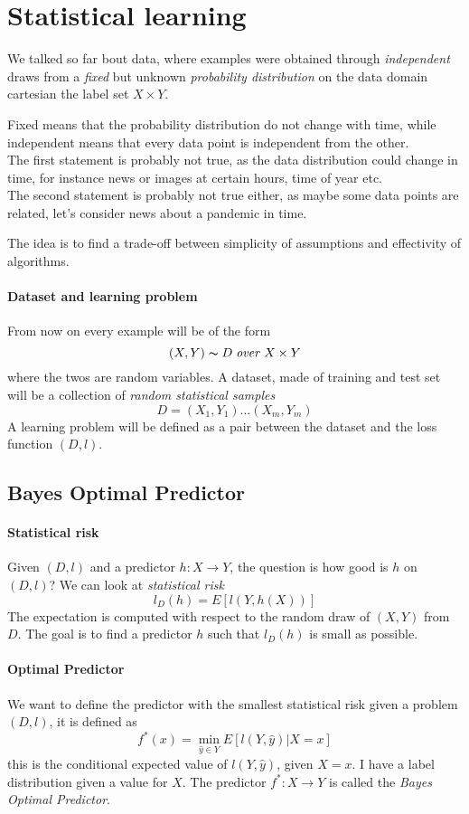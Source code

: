 \section{Statistical learning}

We talked so far bout data, where 
examples were obtained through \emph{independent} draws from a \emph{fixed} but unknown 
\emph{probability distribution} on the data domain cartesian the label set $X \times Y$.

Fixed means that the probability distribution do not change with time, while independent means 
that every data point is independent from the other. \\The first statement is probably not true, 
as the data distribution could change in time, for instance news or images at certain hours, 
time of year etc.\\
The second statement is probably not true either, as maybe some data points are related, 
let's consider news about a pandemic in time.

The idea is to find a trade-off between simplicity of assumptions and effectivity of algorithms.

\paragraph{Dataset and learning problem}
From now on every example will be of the form $$(X,Y) \thicksim D \mathit{\;over\;} X \times Y$$ 
where the twos are random variables.
A dataset, made of training and test set will be a collection of \emph{random statistical samples}
$$D = (X_1, Y_1) \dots (X_m, Y_m)$$
A learning problem will be defined as a pair between the dataset and the loss function $(D,l)$.

\subsection{Bayes Optimal Predictor}

\paragraph{Statistical risk}
Given $(D,l)$ and a predictor $h: X \rightarrow Y$, the question is how good is $h$ on $(D,l)$?
We can look at \emph{statistical risk}
$$l_D(h) = E[l(Y, h(X))]$$
The expectation is computed with respect to the random draw of $(X,Y)$ from $D$.
The goal is to find a predictor $h$ such that $l_D(h)$ is small as possible.

\paragraph{Optimal Predictor}
We want to define the predictor with the smallest statistical risk given a problem $(D,l)$, 
it is defined as
$$f^*(x) = \min_{\hat{y} \in Y}E[l(Y, \hat{y})| X =x]$$
this is the conditional expected value of $l(Y, \hat{y})$, given $X = x$. I have a label 
distribution given a value for $X$.
The predictor $f^* : X \rightarrow Y$ is called the \emph{Bayes Optimal Predictor}.

